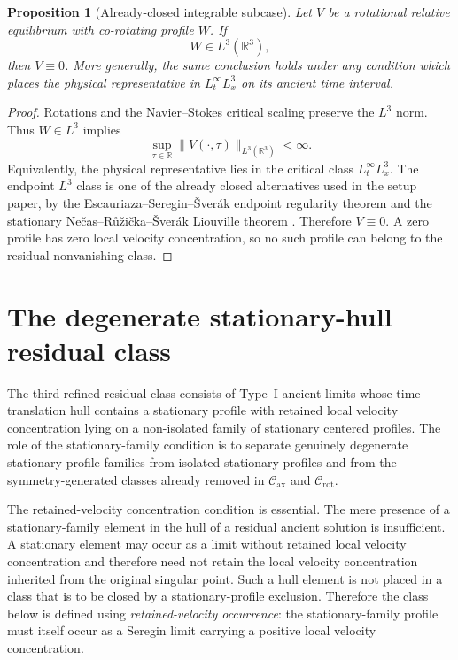 \documentclass[11pt]{amsart}
\numberwithin{equation}{section}
\theoremstyle{plain}
\newtheorem{proposition}[proposition]{Proposition}
\theoremstyle{definition}
\theoremstyle{remark}
\newcommand{\Cax}{\mathcal C_{\mathrm{ax}}}
\newcommand{\Crot}{\mathcal C_{\mathrm{rot}}}
\begin{document}
\begin{proposition}[Already-closed integrable subcase]
\label{prop:R2-integrable-subcase}
Let \(V\) be a rotational relative equilibrium with co-rotating profile \(W\).
If
\begin{equation}\label{eq:R2-L3-subcase}
   W\in L^3(\mathbb R^3),
\end{equation}
then \(V\equiv0\).  More generally, the same conclusion holds under any
condition which places the physical representative in
\(L^\infty_tL^3_x\) on its ancient time interval.
\end{proposition}

\begin{proof}
Rotations and the Navier--Stokes critical scaling preserve the \(L^3\) norm.
Thus \(W\in L^3\) implies
\[
   \sup_{\tau\in\mathbb R}\|V(\cdot,\tau)\|_{L^3(\mathbb R^3)}<\infty .
\]
Equivalently, the physical representative lies in the critical class
\(L^\infty_tL^3_x\).  The endpoint \(L^3\) class is one of the already closed
alternatives used in the setup paper, by the Escauriaza--Seregin--\v Sver\'ak endpoint
regularity theorem \cite{ESS2003} and the stationary
Ne\v cas--R\r u\v zi\v cka--\v Sver\'ak Liouville theorem \cite{NRS1996}.
Therefore
\(V\equiv0\).  A zero profile has zero local velocity concentration, so no such profile
can belong to the residual
nonvanishing class.
\end{proof}


\section{The degenerate stationary-hull residual class}
\label{sec:R3-degenerate-stationary-hull}

The third refined residual class consists of Type~I ancient limits whose
time-translation hull contains a stationary
profile with retained local velocity concentration lying on a non-isolated family of
stationary centered profiles.  The role of the stationary-family condition is to separate genuinely degenerate
stationary profile families from isolated stationary profiles and from the
symmetry-generated classes already removed in \(\Cax\) and \(\Crot\).

The retained-velocity concentration condition is essential.  The mere presence of a
stationary-family element in the hull of a residual ancient solution is insufficient.  A
stationary element may occur as a limit without retained local velocity concentration and
therefore need not retain the local velocity concentration inherited from the
original singular point.  Such a hull element is not placed in a class
that is to be closed by a
stationary-profile exclusion.  Therefore the class below is defined using
\emph{retained-velocity occurrence}: the stationary-family profile must
itself occur as a Seregin limit carrying a positive local velocity concentration.
\end{document}
